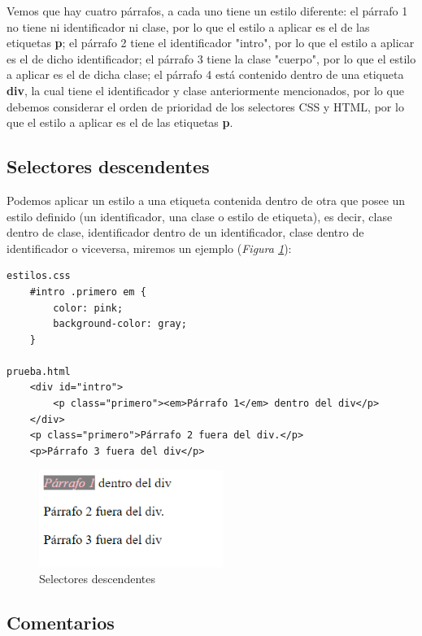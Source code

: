 Vemos que hay cuatro párrafos, a cada uno tiene un estilo diferente: el párrafo 1 no tiene ni identificador ni clase, por lo que el estilo a aplicar es el de las etiquetas \textbf{p}; el párrafo 2 tiene el identificador "intro", por lo que el estilo a aplicar es el de dicho identificador; el párrafo 3 tiene la clase "cuerpo", por lo que el estilo a aplicar es el de dicha clase; el párrafo 4 está contenido dentro de una etiqueta \textbf{div}, la cual tiene el identificador y clase anteriormente mencionados, por lo que debemos considerar el orden de prioridad de los selectores CSS y HTML, por lo que el estilo a aplicar es el de las etiquetas \textbf{p}.


\subsection{Selectores descendentes}

Podemos aplicar un estilo a una etiqueta contenida dentro de otra que posee un estilo definido (un identificador, una clase o estilo de etiqueta), es decir, clase dentro de clase, identificador dentro de un identificador, clase dentro de identificador o viceversa, miremos un ejemplo (\textit{Figura \ref{fig: 2}}):
\begin{lstlisting}
estilos.css
    #intro .primero em {
        color: pink;
        background-color: gray;
    }

prueba.html
    <div id="intro">
        <p class="primero"><em>Párrafo 1</em> dentro del div</p>
    </div>
    <p class="primero">Párrafo 2 fuera del div.</p>
    <p>Párrafo 3 fuera del div</p>
\end{lstlisting}
\begin{figure}[H]
    \begin{center}
        \caption{Selectores descendentes}
        \label{fig: 2}
        \includegraphics[width=6cm]{ss/selectores descendente.png}
    \end{center}
\end{figure}


\subsection{Comentarios}

